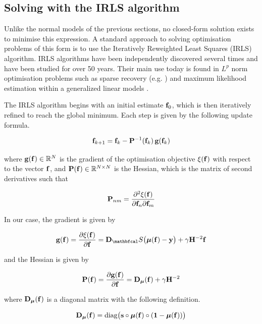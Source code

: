 \subsection{Solving with the IRLS algorithm}

Unlike the normal models of the previous sections, no closed-form solution exists to minimise this expression. A standard approach to solving optimisation problems of this form is to use the Iteratively Reweighted Least Squares (IRLS) algorithm. IRLS algorithms have been independently discovered several times and have been studied for over 50 years. Their main use today is found in $L^p$ norm optimisation problems such as sparse recovery (e.g. \cite{Gorodnitsky1997,Daubechies2010}) and maximum likelihood estimation within a generalized linear models \citep{Nelder1972}. 

The IRLS algorithm begins with an initial estimate $\mathbf{f}_0$, which is then iteratively refined to reach the global minimum. Each step is given by the following update formula. 

\begin{equation}
    \label{eq:irls_update}
    \mathbf{f}_{k+1} = \mathbf{f}_{k} - \mathbf{P}^{-1}(\mathbf{f}_k) \, \mathbf{g}(\mathbf{f}_k)
\end{equation}

where $ \mathbf{g}(\mathbf{f}) \in \mathbb{R}^N$ is the gradient of the optimisation objective $\xi(\mathbf{f})$ with respect to the vector $\mathbf{f}$, and $\mathbf{P}(\mathbf{f}) \in \mathbb{R}^{N \times N}$ is the Hessian, which is the matrix of second derivatives such that

\begin{equation*}
    \mathbf{P}_{nm} = \frac{\partial^2 \xi(\mathbf{f})}{\partial \mathbf{f}_n \partial \mathbf{f}_m}
\end{equation*}

In our case, the gradient is given by 

\begin{equation}
    \g(\f) = \frac{\partial \xi(\f)}{\partial \f} = \D_\St \big(\muu(\f) - \y\big) + \gamma \HH^{-2} \f
\end{equation}

and the Hessian is given by 

\begin{equation}
    \label{eq:logistic_gsr_P}
    \mathbf{P}(\mathbf{f}) = \frac{\partial \mathbf{g}(\mathbf{f})}{\partial \mathbf{f}} =  \mathbf{D}_{\boldsymbol{\mu}}(\mathbf{f}) + \gamma \mathbf{H}^{-2}
\end{equation}

where $\mathbf{D}_{\boldsymbol{\mu}}(\mathbf{f})$ is a diagonal matrix with the following definition. 

\begin{equation*}
    \mathbf{D}_{\boldsymbol{\mu}}(\mathbf{f}) = \text{diag}\big(\mathbf{s} \circ \boldsymbol{\mu}(\mathbf{f}) \circ (\mathbf{1} - \boldsymbol{\mu}(\mathbf{f}))\big)
\end{equation*}

